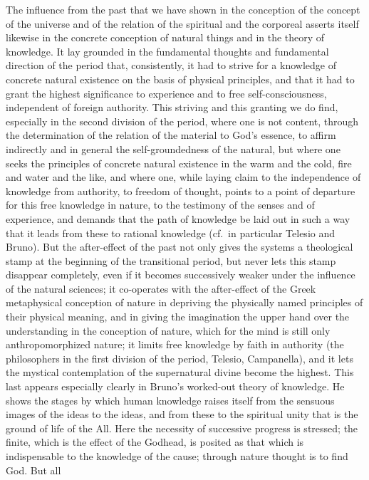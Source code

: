The influence from the past that we have shown in the conception of the
concept of the universe and of the relation of the spiritual and the
corporeal asserts itself likewise in the concrete conception of natural
things and in the theory of knowledge. It lay grounded in the
fundamental thoughts and fundamental direction of the period that,
consistently, it had to strive for a knowledge of concrete natural
existence on the basis of physical principles, and that it had to grant
the highest significance to experience and to free self-consciousness,
independent of foreign authority. This striving and this granting we do
find, especially in the second division of the period, where
one is not content, through the determination of the relation of the
material to God's essence, to affirm indirectly and in general the
self-groundedness of the natural, but where one seeks the principles of
concrete natural existence in the warm and the cold, fire and water and
the like, and where one, while laying claim to the independence of
knowledge from authority, to freedom of thought, points to a point of
departure for this free knowledge in nature, to the testimony of the
senses and of experience, and demands that the path of knowledge be laid
out in such a way that it leads from these to rational knowledge
(cf.\ in particular Telesio and Bruno). But the after-effect of the past
not only gives the systems a theological stamp at the beginning of the
transitional period, but never lets this stamp disappear completely,
even if it becomes successively weaker under the influence of the
natural sciences; it co-operates with the after-effect of the Greek
metaphysical conception of nature in depriving the physically named
principles of their physical meaning, and in giving the imagination the
upper hand over the understanding in the conception of nature, which for
the mind is still only anthropomorphized nature; it limits free
knowledge by faith in authority (the philosophers in the first division
of the period, Telesio, Campanella), and it lets the mystical
contemplation of the supernatural divine become the highest. This last
appears especially clearly in Bruno's worked-out theory of knowledge. He
shows the stages by which human knowledge raises itself from the
sensuous images of the ideas to the ideas, and from these to the
spiritual unity that is the ground of life of the All. Here the
necessity of successive progress is stressed; the finite, which is the
effect of the Godhead, is posited as that which is indispensable to the
knowledge of the cause; through nature thought is to find God. But all
